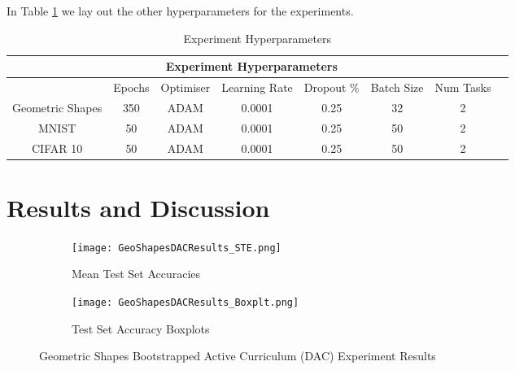 In Table \ref{tab:HyperParams2} we lay out the other hyperparameters for the experiments.

\begin{table}[h!]
\caption{Experiment Hyperparameters} \label{tab:HyperParams2}
\hspace*{-1cm}
\begin{tabular}{|c||c|c|c|c|c|c|c|}
\hline
\multicolumn{7}{|c|}{Experiment Hyperparameters} \\
\hline
 &Epochs & Optimiser &Learning Rate & Dropout \% & Batch Size & Num Tasks\\
\hline
Geometric Shapes & 350 & ADAM & 0.0001 & 0.25 & 32 & 2  \\
\hline
MNIST & 50 & ADAM & 0.0001 & 0.25 & 50 & 2  \\
\hline
CIFAR 10 & 50 & ADAM & 0.0001 & 0.25 & 50 & 2  \\
\hline
\end{tabular}
\end{table}


\section{Results and Discussion}

\begin{figure}[h]
\hspace*{-3cm}    
\centering
\begin{subfigure}{0.7\textwidth}
  \centering
  \texttt{[image: GeoShapesDACResults\_STE.png]}
  \caption{ Mean Test Set Accuracies}
  \label{fig:DAC_StE_Geo}
\end{subfigure}%
\begin{subfigure}{0.7\textwidth}
\hspace*{-1cm}   
  \centering
  \texttt{[image: GeoShapesDACResults\_Boxplt.png]}
  \caption{Test Set Accuracy Boxplots}
  \label{fig:DAC_BoxPlt_Geo}
\end{subfigure}
\caption{Geometric Shapes Bootstrapped Active Curriculum (DAC) Experiment Results}
\label{fig:GeoShapesBACResults}
\end{figure}